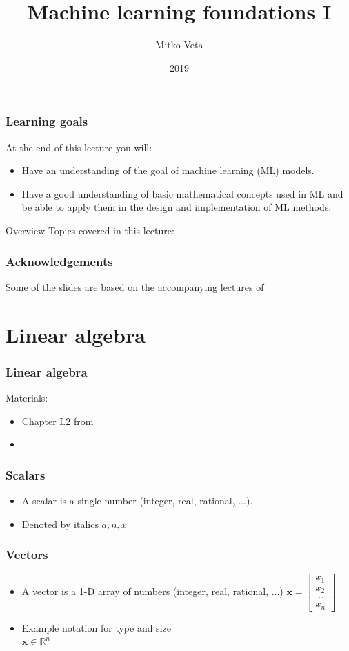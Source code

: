 \documentclass[notes]{beamer}          %
\title{Machine learning foundations I}
\author{Mitko Veta}
\institute{Eindhoven University of Technology

Department of Biomedical Engineering}
\date{2019}
\newcommand{\vect}[1]{\bm{#1}}
\newcommand{\field}[1]{\mathbb{#1}}
\newcommand{\R}{\field{R}}
\begin{document}
\frame{\titlepage}


\begin{frame}
\frametitle{Learning goals}

At the end of this lecture you will:
\begin{itemize}
    \item Have an understanding of the goal of machine learning (ML) models.
    \item Have a good understanding of basic mathematical concepts used in ML and be able to apply them in the design and implementation of ML methods.
\end{itemize}
\end{frame}

\begin{frame}{Overview}
Topics covered in this lecture:
    \tableofcontents
\end{frame}

\begin{frame}
\frametitle{Acknowledgements}
Some of the slides are based on the accompanying lectures of \cite{deeplearning}
\end{frame}


\section{Linear algebra}

\begin{frame}
\frametitle{Linear algebra}
Materials:
\begin{itemize}
    \item Chapter I.2 from \cite{deeplearning}
    \item \cite{linearalgebra}
\end{itemize}

\end{frame}

\begin{frame}
\frametitle{Scalars}
\begin{itemize}
    \item A scalar is a single number (integer, real, rational, ...).
    \item Denoted by italics $a, n, x$

\end{itemize}
\end{frame}

\begin{frame}
\frametitle{Vectors}
\begin{itemize}
    \item A vector is a 1-D array of numbers (integer, real, rational, ...)
    $
    \vect{x} = \begin{bmatrix} x_1 \\ x_2 \\ \ldots \\ x_n \end{bmatrix}
    $
    \item{Example notation for type and size} \\
    $\vect{x} \in \R^n$
 \end{itemize}
\end{frame}
\end{document}
